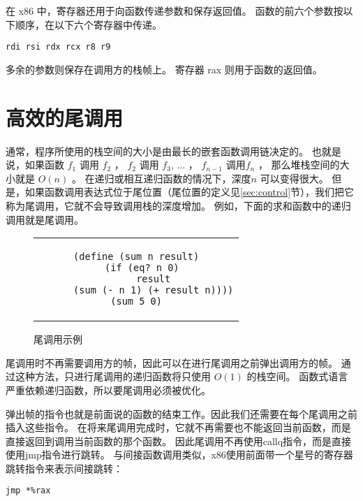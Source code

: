 在 x86 中，寄存器还用于向函数传递参数和保存返回值。
函数的前六个参数按以下顺序，在以下六个寄存器中传递。

\begin{onelinecode}
\begin{lstlisting}
rdi rsi rdx rcx r8 r9
\end{lstlisting}
\end{onelinecode}

多余的参数则保存在调用方的栈帧上。
寄存器 rax 则用于函数的返回值。

\section{高效的尾调用}
\label{sec:tail-call}

通常，程序所使用的栈空间的大小是由最长的嵌套函数调用链决定的。
也就是说，如果函数
$f_1$ 调用 $f_2$ ， $f_2$ 调用 $f_3$, $\ldots$ ， $f_{n-1}$ 调用$f_n$ ，
那么堆栈空间的大小就是 $O(n)$ 。
在递归或相互递归函数的情况下，深度$n$ 可以变得很大。
但是，如果函数调用表达式位于尾位置（尾位置的定义见\ref{sec:control}节），我们把它称为尾调用，它就不会导致调用栈的深度增加。
例如，下面的求和函数中的递归调用就是尾调用。

\begin{figure}[h]
\begin{center}
\begin{tabular}{c}
\begin{lstlisting}
(define (sum n result)
  (if (eq? n 0)
      result
      (sum (- n 1) (+ result n))))
(sum 5 0)
\end{lstlisting}
\end{tabular}
\end{center}

	\caption{尾调用示例}
	\label{fig:tail-call-eg}
\end{figure}

尾调用时不再需要调用方的帧，因此可以在进行尾调用之前弹出调用方的帧。
通过这种方法，只进行尾调用的递归函数将只使用 $O(1)$ 的栈空间。
函数式语言严重依赖递归函数，所以要尾调用必须被优化。

弹出帧的指令也就是前面说的函数的结束工作。因此我们还需要在每个尾调用之前插入这些指令。
在将来尾调用完成时，它就不再需要也不能返回当前函数，而是直接返回到调用当前函数的那个函数。
因此尾调用不再使用callq指令，而是直接使用jmp指令进行跳转。
与间接函数调用类似，x86使用前面带一个星号的寄存器跳转指令来表示间接跳转：
\begin{onelinecode}
\begin{lstlisting}
jmp *%rax
\end{lstlisting}
\end{onelinecode}

